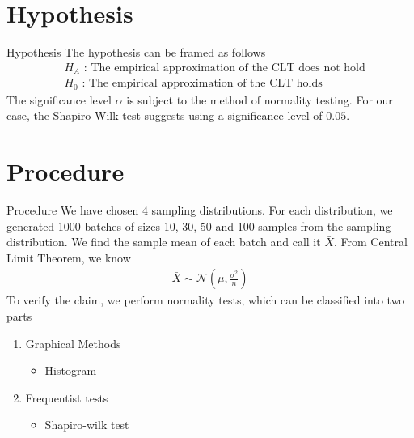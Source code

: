 \documentclass[10pt]{beamer}
\begin{document}
\section{Hypothesis}
\begin{frame}{Hypothesis}
    The hypothesis can be framed as follows
\begin{align}
    & H_A\text{ : The empirical approximation of the CLT does not hold} \nonumber\\
    & H_0\text{ : The empirical approximation of the CLT holds}\nonumber
\end{align}
The significance level $\alpha$ is subject to the method of normality testing. For our case, the Shapiro-Wilk test suggests using a significance level of $0.05$. 
\end{frame}

\section{Procedure}
\begin{frame}{Procedure}
We have chosen 4 sampling distributions. For each distribution, we generated 1000 batches of sizes 10, 30, 50 and 100 samples from the sampling distribution. We find the sample mean of each batch and call it $\bar{X}$. From Central Limit Theorem, we know
\begin{align}
    \bar{X} \sim \mathcal{N}\left(\mu, \frac{\sigma^2}{n}\right)
\end{align}
To verify the claim, we perform normality tests, which can be classified into two parts
\begin{enumerate}
    \item Graphical Methods
    \begin{itemize}
        \item Histogram
    \end{itemize}
    \item{Frequentist tests}
    \begin{itemize}
        \item Shapiro-wilk test
    \end{itemize}
\end{enumerate}
\end{frame}
\end{document}
